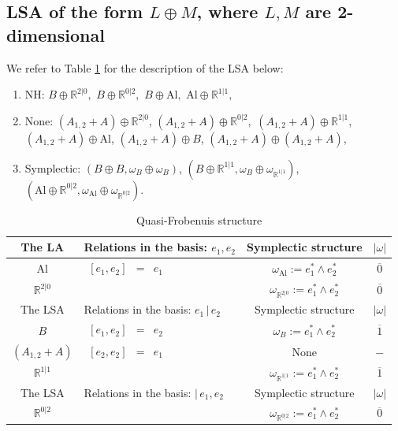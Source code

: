 \documentclass[12pt]{amsart}
\begin{document}
\subsection{LSA of the form \texorpdfstring{$L\oplus M$}{L+M}, where \texorpdfstring{$L, M$}{L,M} are 2-dimensional} We refer to Table \ref{tab7} for the description of the LSA below: 


\begin{enumerate}
\item NH: $B\oplus \mathbb{R}^{2|0},$ $B\oplus \mathbb{R}^{0|2},$ $B\oplus \mathrm{Al},$ $ \mathrm{Al}\oplus \mathbb{R}^{1|1},$ 
\item None: $(A_{1,2}+A)\oplus \mathbb{R}^{2|0}$, $(A_{1,2}+A)\oplus \mathbb{R}^{0|2},$ $(A_{1,2}+A)\oplus \mathbb{R}^{1|1}$, $(A_{1,2}+A)\oplus \mathrm{Al}$, $(A_{1,2}+A)\oplus B$,  $(A_{1,2}+A)\oplus (A_{1,2}+A)$,
\item Symplectic: $(B\oplus B, \omega_B\oplus \omega_B)$, $(B\oplus \mathbb{R}^{1|1}, \omega_B\oplus \omega_{\mathbb{R}^{1|1}})$, $(\mathrm{Al}\oplus \mathbb{R}^{0|2}, \omega_{\mathrm{Al}}\oplus \omega_{\mathbb{R}^{0|2}})$.
\end{enumerate}

\footnotesize
\begin{table}[H]
\centering
\begin{tabular}{| c | l | c |c|}
\hline
 The LA & Relations in the basis: $e_1,e_2$ & Symplectic structure & $|\omega|$ \\ \hline
 $\mathrm{Al}$ & $
\begin{array}{lcr}
[e_1, e_2]&=&e_1 
\end{array}$ & $\omega_{\mathrm{Al}}:=e_1^*\wedge e_2^*$ & $ \overline{0}$\\ \hline
 $\mathbb{R}^{2|0}$ &  & $\omega_{\mathbb{R}^{2|0}}:=e_1^*\wedge e_2^*$ & $ \overline{0}$\\ \hline
 The LSA & Relations in the basis: $e_1\,|\,e_2$ & Symplectic structure & $|\omega|$ \\ \hline
 $B$ & $
\begin{array}{lcr}
[e_1, e_2]&=&e_2 
\end{array}$ & $\omega_B:=e_1^*\wedge e_2^*$ & $ \overline{1}$\\ \hline
$(A_{1,2}+A)$ & $
\begin{array}{lcr}
[e_2, e_2]&=&e_1
\end{array}$ & None & $-$\\ \hline
$\mathbb{R}^{1|1}$ &  & $\omega_{\mathbb{R}^{1|1}}:=e_1^*\wedge e_2^*$ & $ \overline{1}$\\ \hline
The LSA & Relations in the basis: $|\,e_1, e_2$ & Symplectic structure & $|\omega|$ \\ \hline
$\mathbb{R}^{0|2}$ &  & $\omega_{\mathbb{R}^{0|2}}:=e_1^*\wedge e_2^*$ & $ \overline{0}$\\ \hline
\end{tabular}
\caption{Quasi-Frobenuis structure}\label{tab7}
\end{table}
\end{document}
